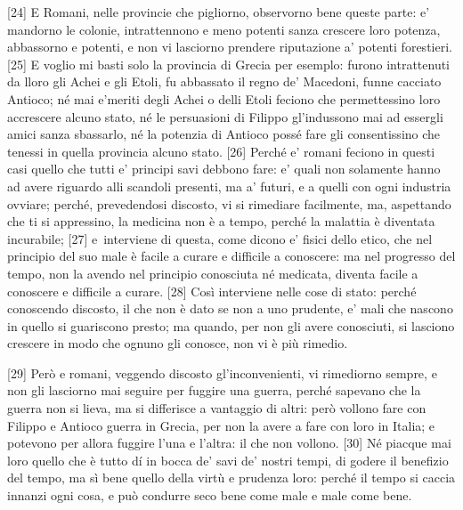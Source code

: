 {[}24{]} E Romani, nelle provincie che pigliorno, observorno bene queste
parte: e' mandorno le colonie, intrattennono e meno potenti sanza
crescere loro potenza, abbassorno e potenti, e non vi lasciorno prendere
riputazione a' potenti forestieri. {[}25{]} E voglio mi basti solo la
provincia di Grecia per esemplo: furono intrattenuti da lloro gli Achei
e gli Etoli, fu abbassato il regno de' Macedoni, funne cacciato Antioco;
né mai e'meriti degli Achei o delli Etoli feciono che permettessino loro
accrescere alcuno stato, né le persuasioni di Filippo gl'indussono mai
ad essergli amici sanza sbassarlo, né la potenzia di Antioco possé fare
gli consentissino che tenessi in quella provincia alcuno stato. {[}26{]}
Perché e' romani feciono in questi casi quello che tutti e' principi
savi debbono fare: e' quali non solamente hanno ad avere riguardo alli
scandoli presenti, ma a' futuri, e a quelli con ogni industria ovviare;
perché, prevedendosi discosto, vi si rimediare facilmente, ma,
aspettando che ti si appressino, la medicina non è a tempo, perché la
malattia è diventata incurabile; {[}27{]} e\est\ interviene di questa, come
dicono e' fisici dello etico, che nel principio del suo male è facile a
curare e difficile a conoscere: ma nel progresso del tempo, non la
avendo nel principio conosciuta né medicata, diventa facile a conoscere
e difficile a curare. {[}28{]} Così interviene nelle cose di stato:
perché conoscendo discosto, il che non è dato se non a uno prudente, e'
mali che nascono in quello si guariscono presto; ma quando, per non gli
avere conosciuti, si lasciono crescere in modo che ognuno gli conosce,
non vi è più rimedio.

{[}29{]} Però e romani, veggendo discosto gl'inconvenienti, vi
rimediorno sempre, e non gli lasciorno mai seguire per fuggire una
guerra, perché sapevano che la guerra non si lieva, ma si differisce a
vantaggio di altri: però vollono fare con Filippo e Antioco guerra in
Grecia, per non la avere a fare con loro in Italia; e potevono per
allora fuggire l'una e l'altra: il che non vollono. {[}30{]} Né piacque
mai loro quello che è tutto dí in bocca de' savi de' nostri tempi, di
godere il benefizio del tempo, ma sì bene quello della virtù e prudenza
loro: perché il tempo si caccia innanzi ogni cosa, e può condurre seco
bene come male e male come bene.

